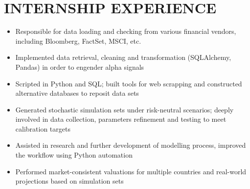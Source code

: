 \documentclass[classic]{resume}
\begin{document}
    \section{INTERNSHIP EXPERIENCE}
    \begin{itemize}
        \item Responsible for data loading and checking from various financial vendors, including Bloomberg, FactSet, MSCI, etc.
        \item Implemented data retrieval, cleaning and transformation (SQLAlchemy, Pandas) in order to engender alpha signals
        \item Scripted in Python and SQL; built tools for web scrapping and constructed alternative databases to reposit data sets
    \end{itemize}

    \begin{itemize}
        \item Generated stochastic simulation sets under risk-neutral scenarios; deeply involved in data collection, parameters refinement and testing to meet calibration targets
        \item Assisted in research and further development of modelling process, improved the workflow using Python automation
        \item Performed market-consistent valuations for multiple countries and real-world projections based on simulation sets
    \end{itemize}
\end{document}
